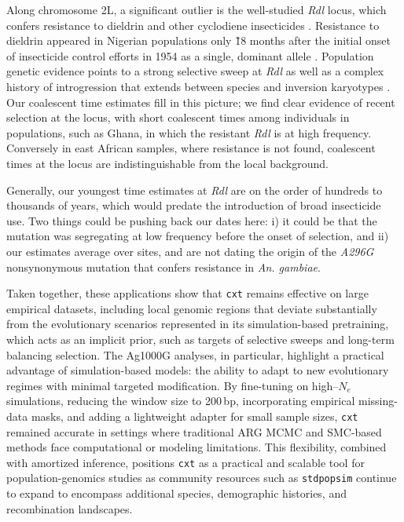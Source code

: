 \documentclass{article}
\newcommand{\cxtkit}{\texttt{cxt}\xspace}
\let\citep\parencite
\newcommand{\stdpopsim}{\texttt{stdpopsim}\xspace}
\begin{document}
Along chromosome 2L, a significant outlier is the well-studied \emph{Rdl} locus,
which confers resistance to dieldrin and other cyclodiene insecticides \citep{ffrench1993point,thompson1993conservation,du2005independent}.
Resistance to dieldrin appeared in Nigerian populations only \~18 months 
after the initial onset of insecticide control efforts in 1954 \citep{elliott1956insecticide}
as a single, dominant allele \citep{davidson1962case}.
Population genetic evidence points to a strong selective sweep at \emph{Rdl}
as well as a complex history of introgression that extends between species and inversion karyotypes \citep{grau2020evolution}.
Our coalescent time estimates fill in this picture; 
we find clear evidence of recent selection at the locus, with 
short coalescent times among individuals in populations,
such as Ghana, in which the resistant \emph{Rdl} is at high frequency.
Conversely in east African samples, where resistance is not found, 
coalescent times at the locus are indistinguishable from the local background.

Generally, our youngest time estimates at \emph{Rdl} are on the order of hundreds to thousands of years, 
which would predate the introduction of broad insecticide use. 
Two things could be pushing back our dates here: i) it could
be that the mutation was segregating at low frequency before the onset of
selection, and ii) our estimates average over sites, and are not dating 
the origin of the \emph{A296G} nonsynonymous mutation that confers 
resistance in \emph{An. gambiae}.

Taken together, these applications show that \cxtkit remains effective on large empirical datasets, 
including local genomic regions that deviate substantially from the evolutionary scenarios represented in its simulation-based pretraining, which acts as an implicit prior, 
such as targets of selective sweeps and long-term balancing selection.
The Ag1000G analyses, in particular, highlight a practical advantage of simulation-based models: the ability to adapt to new evolutionary regimes with minimal targeted modification.
By fine-tuning on high--$N_e$ simulations, reducing the window size to 200\,bp, incorporating empirical missing-data masks, and adding a lightweight adapter for small sample sizes, \cxtkit remained accurate in settings where traditional ARG MCMC and SMC-based methods face computational or modeling limitations.
This flexibility, combined with amortized inference, positions \cxtkit as a practical and scalable tool for population-genomics studies as community resources such as \stdpopsim continue to expand to encompass additional species, demographic histories, and recombination landscapes.
\end{document}
